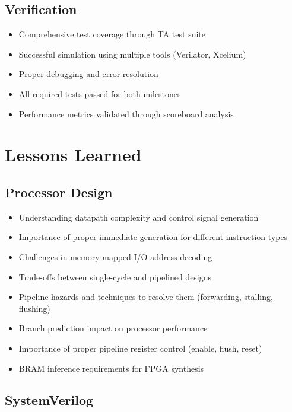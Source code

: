 \subsection{Verification}

\begin{itemize}
    \item Comprehensive test coverage through TA test suite
    \item Successful simulation using multiple tools (Verilator, Xcelium)
    \item Proper debugging and error resolution
    \item All required tests passed for both milestones
    \item Performance metrics validated through scoreboard analysis
\end{itemize}

\section{Lessons Learned}

\subsection{Processor Design}

\begin{itemize}
    \item Understanding datapath complexity and control signal generation
    \item Importance of proper immediate generation for different instruction types
    \item Challenges in memory-mapped I/O address decoding
    \item Trade-offs between single-cycle and pipelined designs
    \item Pipeline hazards and techniques to resolve them (forwarding, stalling, flushing)
    \item Branch prediction impact on processor performance
    \item Importance of proper pipeline register control (enable, flush, reset)
    \item BRAM inference requirements for FPGA synthesis
\end{itemize}

\subsection{SystemVerilog}

